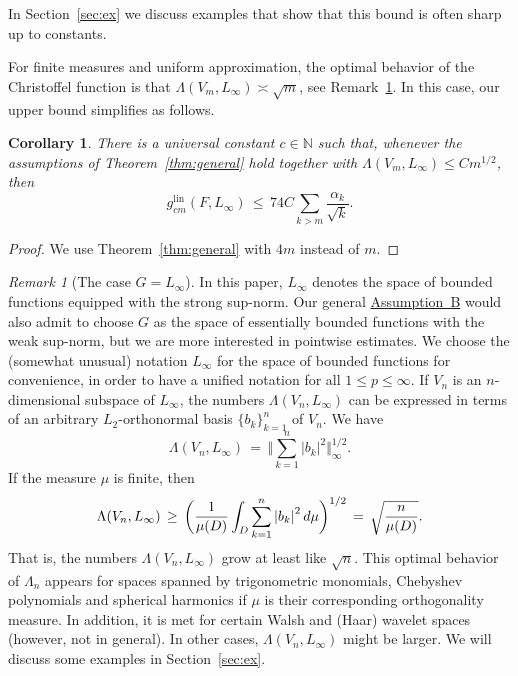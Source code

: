 \documentclass[a4paper,12pt]{amsart}
\newtheorem{corollary}[theorem]{Corollary}
\theoremstyle{definition}
\theoremstyle{remark}
\newtheorem{remark}[theorem]{Remark}
\newcommand{\bx}{\mathbf{x}}
\newcommand{\lin}{\ensuremath{\mathrm{lin}}}
\begin{document}
\medskip

In Section~\ref{sec:ex} we discuss examples that show that 
this bound is often sharp up to constants.

For finite measures and uniform approximation, the optimal behavior of the Christoffel function is that $\Lambda(V_m,L_\infty) \asymp \sqrt{m}$, see Remark~\ref{rem:minimal-Chris}.
In this case, 
our upper bound simplifies as follows.

\begin{corollary}\label{coro:Linf}
 There is a universal constant $c\in\mathbb{N}$ such that,
 whenever the assumptions of Theorem~\ref{thm:general} hold together with $\Lambda(V_m,L_\infty) \le C m^{1/2}$, then
\[
 g_{cm}^\lin( F , L_\infty) \,\le\, 74 C \sum_{k > m} \frac{ \alpha_k}{\sqrt{k}}.
\]
\end{corollary}

\begin{proof}
 We use Theorem~\ref{thm:general} with $4m$ instead of $m$.
\end{proof}

\begin{remark}[{The case $G=L_\infty$}]%
\label{rem:minimal-Chris} 
{In this paper, $L_\infty$ denotes the space of bounded functions equipped with the strong sup-norm. Our general
\hyperlink{assum}
{Assumption~B} would also admit to choose $G$ as the space of essentially bounded functions with the weak sup-norm, but we are more interested in pointwise estimates. We choose the (somewhat unusual) notation $L_\infty$ for the space of bounded functions for convenience, in order to have a unified notation for all $1\le p \le \infty$.
If $V_n$ is an $n$-dimensional subspace of $L_\infty$, the numbers $\Lambda(V_n,L_\infty)$ can be expressed in terms of an arbitrary $L_2$-}orthonormal basis 
$\{ b_k\}_{k=1}^{n}$ 
of $V_n$. 
We have
\begin{equation}\label{gamma2}
\Lambda(V_n,L_\infty) \,=\, 
\Big\Vert\sum_{k=1}^{n} \left| b_k \right|^2\Big\Vert_{\infty}^{1/2}.
\end{equation}
If the measure $\mu$ is finite, then
\begin{equation*}%
    \Lambda(V_n,L_\infty) \,\ge\,  \bigg( \frac{1}{\mu(D)} \int_D \sum_{k=1}^{n} \left| b_k \right|^2 {\rm d}\mu \bigg)^{1/2}
    \,=\, \sqrt{\frac{n}{\mu(D)}}.
\end{equation*}
That is, the numbers $\Lambda(V_n,L_\infty)$ grow at least like $\sqrt{n}$.
This optimal behavior of $\Lambda_n$ appears
for spaces spanned by
trigonometric monomials, Chebyshev polynomials and spherical harmonics if $\mu$ is their corresponding orthogonality measure. In addition, it is met for certain Walsh and 
 (Haar) wavelet spaces (however, not in general).
In other cases, {$\Lambda(V_n,L_\infty)$} might be larger. 
We will discuss some examples in Section~\ref{sec:ex}.
\end{remark}
\end{document}

